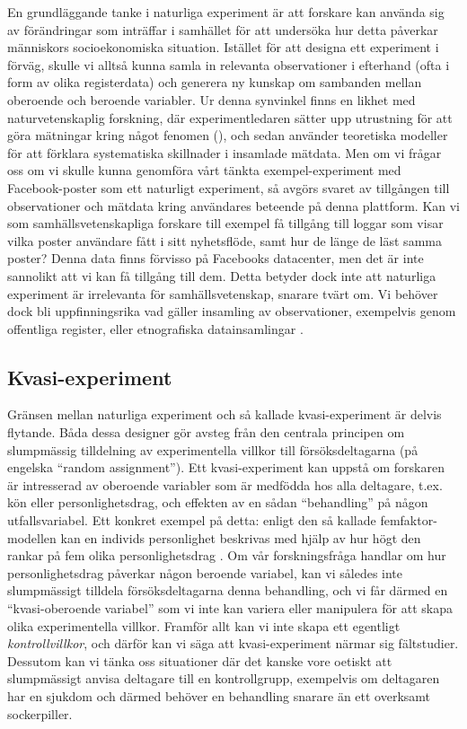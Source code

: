 \documentclass[
]{book}
\begin{document}
En grundläggande tanke i naturliga experiment är att forskare kan använda sig av förändringar som inträffar i samhället för att undersöka hur detta påverkar människors socioekonomiska situation. Istället för att designa ett experiment i förväg, skulle vi alltså kunna samla in relevanta observationer i efterhand (ofta i form av olika registerdata) och generera ny kunskap om sambanden mellan oberoende och beroende variabler. Ur denna synvinkel finns en likhet med naturvetenskaplig forskning, där experimentledaren sätter upp utrustning för att göra mätningar kring något fenomen (), och sedan använder teoretiska modeller för att förklara systematiska skillnader i insamlade mätdata. Men om vi frågar oss om vi skulle kunna genomföra vårt tänkta exempel-experiment med Facebook-poster som ett naturligt experiment, så avgörs svaret av tillgången till observationer och mätdata kring användares beteende på denna plattform. Kan vi som samhällsvetenskapliga forskare till exempel få tillgång till loggar som visar vilka poster användare fått i sitt nyhetsflöde, samt hur de länge de läst samma poster? Denna data finns förvisso på Facebooks datacenter, men det är inte sannolikt att vi kan få tillgång till dem. Detta betyder dock inte att naturliga experiment är irrelevanta för samhällsvetenskap, snarare tvärt om. Vi behöver dock bli uppfinningsrika vad gäller insamling av observationer, exempelvis genom offentliga register, eller etnografiska datainsamlingar \citep{salganik2019bit}.

\hypertarget{sub07.5.9}{%
\subsection{Kvasi-experiment}\label{sub07.5.9}}

Gränsen mellan naturliga experiment och så kallade kvasi-experiment är delvis flytande. Båda dessa designer gör avsteg från den centrala principen om slumpmässig tilldelning av experimentella villkor till försöksdeltagarna (på engelska ``random assignment''). Ett kvasi-experiment kan uppstå om forskaren är intresserad av oberoende variabler som är medfödda hos alla deltagare, t.ex. kön eller personlighetsdrag, och effekten av en sådan ``behandling'' på någon utfallsvariabel. Ett konkret exempel på detta: enligt den så kallade femfaktor-modellen kan en individs personlighet beskrivas med hjälp av hur högt den rankar på fem olika personlighetsdrag \citep{john2010handbook}. Om vår forskningsfråga handlar om hur personlighetsdrag påverkar någon beroende variabel, kan vi således inte slumpmässigt tilldela försöksdeltagarna denna behandling, och vi får därmed en ``kvasi-oberoende variabel'' som vi inte kan variera eller manipulera för att skapa olika experimentella villkor. Framför allt kan vi inte skapa ett egentligt \emph{kontrollvillkor}, och därför kan vi säga att kvasi-experiment närmar sig fältstudier. Dessutom kan vi tänka oss situationer där det kanske vore oetiskt att slumpmässigt anvisa deltagare till en kontrollgrupp, exempelvis om deltagaren har en sjukdom och därmed behöver en behandling snarare än ett overksamt sockerpiller.
\end{document}
